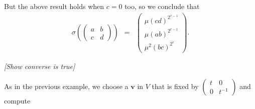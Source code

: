 But the above result holds when $c=0$ too, so we conclude that
\begin{eqnarray*}
\sigma\left(\left(\begin{matrix} a & b \\ c & d \end{matrix}\right)\right) &=&
\left(\begin{matrix}  \mu(cd)^{2^{r-1}}  \\ \mu\left(ab \right)^{2^{r-1}} \\ \mu^2\left( bc \right)^{2^r} \end{matrix}\right). 
\end{eqnarray*}

\emph{[Show converse is true]}

As in the previous example, we choose a $\mathbf{v}$ in $V$ that is fixed by $\left(\begin{matrix} t & 0 \\ 0 & t^{-1}\end{matrix}\right)$ and compute
